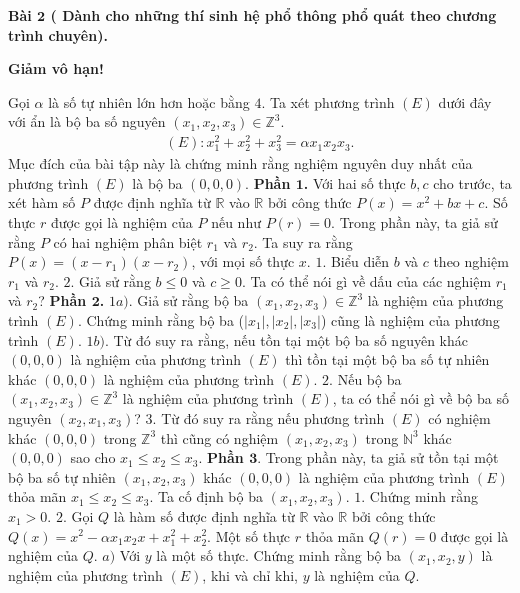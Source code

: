 \begin{multicols}{2}
	\vskip 0.1cm 
	 \textbf{\color{cackithi}Bài $\pmb{2}$ ( Dành cho những thí sinh hệ phổ thông phổ quát theo chương trình chuyên).}
	\vskip 0.1cm 
	\centerline{ \textbf{\color{cackithi}Giảm vô hạn!}}
	\vskip 0.1cm 
	Gọi  $\alpha$ là số tự nhiên lớn hơn hoặc bằng $4$. Ta xét phương trình $(E)$ dưới đây với ẩn là bộ ba số nguyên $(x_1,x_2,x_3 ) \in \mathbb{Z}^3$.
	\begin{align*}
		(E): x_1^2+x_2^2+x_3^2= \alpha x_1x_2x_3.
	\end{align*}
	Mục đích của bài tập này là chứng minh rằng nghiệm nguyên duy nhất của phương trình $(E)$ là bộ ba $(0,0,0)$. 
	\vskip 0.1cm
	 \textbf{\color{cackithi}Phần $\pmb{1}$.} 
	\vskip 0.1cm
	Với hai số thực $b,c$ cho trước, ta xét hàm số $P$ được định nghĩa từ $\mathbb{R}$ vào $\mathbb{R}$ bởi công thức $P(x)=x^2+bx+c$. Số thực $r$ được gọi là nghiệm của $P$ nếu như $P(r)=0$. Trong phần này, ta giả sử rằng $P$ có hai nghiệm phân biệt $r_1$ và $r_2$. Ta suy ra rằng $P(x)=(x-r_1)(x-r_2)$, với mọi số thực $x$.
	\vskip 0.1cm 
	$1.$ Biểu diễn $b$ và $c$ theo nghiệm $r_1$ và $r_2$.
	\vskip 0.1cm
	$2.$ Giả sử rằng $b\le 0$ và $c\ge0$. Ta có thể nói gì về dấu của các nghiệm $r_1$ và $r_2$?
	\vskip 0.1cm 
	 \textbf{\color{cackithi}Phần $\pmb{2}$.}
	\vskip 0.1cm
	$1a)$. Giả sử rằng bộ ba $(x_1,x_2,x_3 ) \in \mathbb{Z}^3$ là nghiệm của phương trình $(E)$. Chứng minh rằng bộ ba ($|x_1 |,|x_2 |,|x_3 |$) cũng là nghiệm của phương trình $(E)$.
	\vskip 0.1cm
	$1b)$. Từ đó suy ra rằng, nếu tồn tại một bộ ba số nguyên khác $(0,0,0)$ là nghiệm của phương trình $(E)$ thì tồn tại một bộ ba số tự nhiên khác $(0,0,0)$ là nghiệm của phương trình $(E)$.
	\vskip 0.1cm 
	$2.$ Nếu bộ ba $(x_1,x_2,x_3 ) \in \mathbb{Z}^3$ là nghiệm của phương trình $(E)$, ta có thể nói gì về bộ ba số nguyên $(x_2,x_1,x_3)$?
	\vskip 0.1cm 
	$3.$ Từ đó suy ra rằng nếu phương trình $(E)$ có nghiệm khác $(0,0,0)$ trong $\mathbb{Z}^3$ thì cũng có nghiệm $(x_1,x_2,x_3)$ trong $\mathbb{N}^3$ khác $(0,0,0)$ sao cho $x_1 \le x_2 \le x_3$.
	\vskip 0.1cm 
	 \textbf{\color{cackithi}Phần $\pmb{3.}$}
	\vskip 0.1cm
	Trong phần này, ta giả sử tồn tại một bộ ba số tự nhiên $(x_1,x_2,x_3)$ khác $(0,0,0)$ là nghiệm của phương trình $(E)$ thỏa mãn $x_1 \le x_2 \le x_3$. Ta cố định bộ ba $(x_1,x_2,x_3)$.
	\vskip 0.1cm 
	$1.$ Chứng minh rằng $x_1>0$.
	\vskip 0.1cm
	$2.$ Gọi $Q$ là hàm số được định nghĩa từ $\mathbb{R}$ vào $\mathbb{R}$ bởi công thức $Q(x)=x^2- \alpha x_1 x_2 x+x_1^2+x_2^2$. Một số thực $r$ thỏa mãn $Q(r)=0$ được gọi là nghiệm của $Q$.
	\vskip 0.1cm 
	$a)$ Với $y$ là một số thực. Chứng minh rằng bộ ba $(x_1,x_2,y)$ là nghiệm của phương trình $(E)$, khi và chỉ khi, $y$ là nghiệm của $Q$.

\end{multicols}
